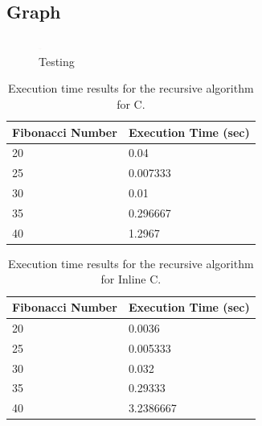 \documentclass{sig-alternate}
\begin{document}
\subsection{Graph}
\begin{figure}[ht]
	\centering
		\includegraphics[width=0.01\textwidth] {CPUcycles.pdf}
	\caption{Testing}
	\label{This is the label}
\end{figure}

\begin{scriptsize}
\begin{table}[ht!]
  \centering
  \begin{tabular}{|l|l|}
    \hline
    \textbf{Fibonacci Number} & \textbf{Execution Time (sec)}\\
    \hline
    20 & 0.04\\
    \hline
    25 & 0.007333\\
	\hline
	30 & 0.01\\
	\hline
	35 & 0.296667\\
	\hline
	40 & 1.2967\\
	\hline
\end{tabular}
\caption{Execution time results for the recursive algorithm for C.}
\label{table:formatting}
\end{table}
\end{scriptsize}

\begin{scriptsize}
\begin{table}[ht!]
  \centering
  \begin{tabular}{|l|l|}
    \hline
    \textbf{Fibonacci Number} & \textbf{Execution Time (sec)}\\
    \hline
    20 & 0.0036\\
    \hline
    25 & 0.005333\\
	\hline
	30 & 0.032\\
	\hline
	35 & 0.29333\\
	\hline
	40 & 3.2386667\\
	\hline
\end{tabular}
\caption{Execution time results for the recursive algorithm for Inline C.}
\label{table:formatting}
\end{table}
\end{scriptsize}
\end{document}
